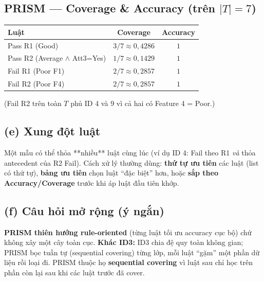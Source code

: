 \subsection*{PRISM --- Coverage \& Accuracy (trên $|T|=7$)}

\begin{center}
\begin{tabular}{@{}lcc@{}}\toprule
Luật & Coverage & Accuracy \\\midrule
Pass R1 (Good) & $3/7\approx 0{,}4286$ & $1$ \\
Pass R2 (Average $\land$ Att3=Yes) & $1/7\approx 0{,}1429$ & $1$ \\
Fail R1 (Poor F1) & $2/7\approx 0{,}2857$ & $1$ \\
Fail R2 (Poor F4) & $2/7\approx 0{,}2857$ & $1$ \\\bottomrule
\end{tabular}
\end{center}

(Fail R2 trên toàn \(T\) phủ ID 4 và 9 vì cả hai có Feature 4 = Poor.)

\subsection*{(e) Xung đột luật}

Một mẫu có thể thỏa **nhiều** luật cùng lúc (ví dụ ID 4: Fail theo R1 \emph{và} thỏa antecedent của R2 Fail). Cách xử lý thường dùng: \textbf{thứ tự ưu tiên} các luật (list có thứ tự), \textbf{bảng ưu tiên} chọn luật ``đặc biệt'' hơn, hoặc \textbf{sắp theo Accuracy/Coverage} trước khi áp luật đầu tiên khớp.

\subsection*{(f) Câu hỏi mở rộng (ý ngắn)}

\textbf{PRISM thiên hướng rule-oriented} (từng luật tối ưu accuracy cục bộ) chứ không xây một cây toàn cục. \textbf{Khác ID3:} ID3 chia đệ quy toàn không gian; PRISM bọc tuần tự (sequential covering) từng lớp, mỗi luật ``gặm'' một phần dữ liệu rồi loại đi. PRISM thuộc họ \textbf{sequential covering} vì luật sau chỉ học trên phần còn lại sau khi các luật trước đã cover.

